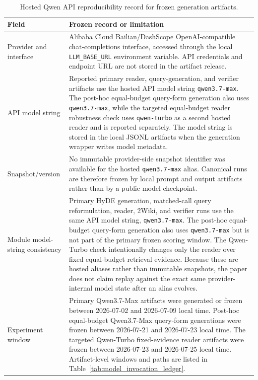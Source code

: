 \begin{table}[t]
\centering
\caption{Hosted Qwen API reproducibility record for frozen generation artifacts.}
\label{tab:qwen_api_reproducibility}
\scriptsize
\begin{threeparttable}
\setlength{\tabcolsep}{3pt}
\begin{tabularx}{\textwidth}{>{\raggedright\arraybackslash}p{}
                            >{\raggedright\arraybackslash}X}
\toprule
Field & Frozen record or limitation \\
\midrule
Provider and interface & Alibaba Cloud Bailian/DashScope OpenAI-compatible chat-completions interface, accessed through the local \texttt{LLM\_BASE\_URL} environment variable. API credentials and endpoint URL are not stored in the artifact release. \\
API model string & Reported primary reader, query-generation, and verifier artifacts use the hosted API model string \texttt{qwen3.7-max}. The post-hoc equal-budget query-form generation also uses \texttt{qwen3.7-max}, while the targeted equal-budget reader robustness check uses \texttt{qwen-turbo} as a second hosted reader and is reported separately. The model string is stored in the local JSONL artifacts when the generation wrapper writes model metadata. \\
Snapshot/version & No immutable provider-side snapshot identifier was available for the hosted \texttt{qwen3.7-max} alias. Canonical runs are therefore frozen by local prompt and output artifacts rather than by a public model checkpoint. \\
Module model-string consistency & Primary HyDE generation, matched-call query reformulation, reader, 2Wiki, and verifier runs use the same API model string, \texttt{qwen3.7-max}. The post-hoc equal-budget query-form generation also uses \texttt{qwen3.7-max} but is not part of the primary frozen scoring window. The Qwen-Turbo check intentionally changes only the reader over fixed equal-budget retrieval evidence. Because these are hosted aliases rather than immutable snapshots, the paper does not claim replay against the exact same provider-internal model state after an alias evolves. \\
Experiment window & Primary Qwen3.7-Max artifacts were generated or frozen between 2026-07-02 and 2026-07-09 local time. Post-hoc equal-budget Qwen3.7-Max query-form generations were frozen between 2026-07-21 and 2026-07-23 local time. The targeted Qwen-Turbo fixed-evidence reader artifacts were frozen between 2026-07-23 and 2026-07-25 local time. Artifact-level windows and paths are listed in Table~\ref{tab:model_invocation_ledger}. \\

\end{tabularx}
\end{threeparttable}
\end{table}
